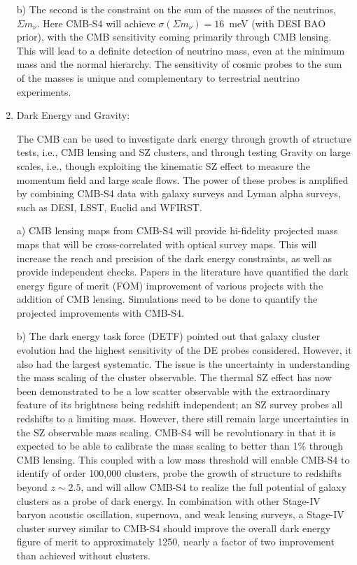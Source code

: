 \begin{enumerate}
{b) The second is the constraint on the sum of the masses of the neutrinos, $\Sigma m_\nu$. Here CMB-S4 will achieve $\sigma(\Sigma m_\nu) = 16$~meV (with DESI BAO prior), with the CMB sensitivity coming primarily through CMB lensing. This will lead to a definite detection of neutrino mass, even at the minimum mass and the normal hierarchy. The sensitivity of cosmic probes to the sum of the masses is unique and complementary to terrestrial neutrino experiments.
 }

\item{Dark Energy and Gravity:

 The CMB can be used to investigate dark energy through growth of structure tests, i.e., CMB lensing and SZ clusters, and through testing Gravity on large scales, i.e., though exploiting the kinematic SZ effect to measure the momentum field and large scale flows. The power of these probes is amplified by combining CMB-S4 data with galaxy surveys and Lyman alpha surveys, such as DESI, LSST, Euclid and WFIRST.

 a) CMB lensing maps from CMB-S4 will provide hi-fidelity projected mass maps that will be cross-correlated with optical survey maps. This will increase the reach and precision of the dark energy constraints, as well as provide independent checks. Papers in the literature have quantified the dark energy figure of merit (FOM) improvement of various projects with the addition of CMB lensing. Simulations need to be done to quantify the projected improvements with CMB-S4.

 b) The dark energy task force (DETF) pointed out that galaxy cluster evolution had the highest 
 sensitivity of the DE probes considered. However, it also had the largest systematic. The issue is the uncertainty in understanding the mass scaling of the cluster observable. The thermal SZ effect has now been demonstrated to be a low scatter observable  with the extraordinary feature of its brightness being redshift independent; an SZ survey probes all redshifts to a limiting mass. However, there still remain large uncertainties in the SZ observable mass scaling. CMB-S4 will be revolutionary in that it is expected to be able to calibrate the mass scaling to better than 1\% through CMB lensing. This coupled with a low mass threshold will enable CMB-S4 to identify of order 100,000 clusters, probe the growth of structure to redshifts beyond $z \sim 2.5$, and will allow CMB-S4 to realize the full potential of galaxy clusters as a probe of dark energy.  In combination with other Stage-IV baryon acoustic oscillation, supernova, and weak lensing surveys, a Stage-IV cluster survey similar to CMB-S4 should improve the overall dark energy figure of merit to approximately 1250, nearly a factor of two improvement than achieved without clusters. 

}
\end{enumerate}
